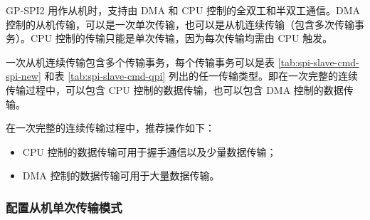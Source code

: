 \documentclass[main\_\_CN.tex]{subfiles}
\begin{document}
GP-SPI2 用作从机时，支持由 DMA 和 CPU 控制的全双工和半双工通信。DMA 控制的从机传输，可以是一次单次传输，也可以是从机连续传输（包含多次传输事务）。CPU 控制的传输只能是单次传输，因为每次传输均需由 CPU 触发。

一次从机连续传输包含多个传输事务，每个传输事务可以是表 \ref{tab:spi-slave-cmd-spi-new} 和表 \ref{tab:spi-slave-cmd-qpi} 列出的任一传输类型。即在一次完整的连续传输过程中，可以包含 CPU 控制的数据传输，也可以包含 DMA 控制的数据传输。

在一次完整的连续传输过程中，推荐操作如下：

\begin{itemize}
    \item CPU 控制的数据传输可用于握手通信以及少量数据传输；

    \item DMA 控制的数据传输可用于大量数据传输。
\end{itemize}


\subsubsection{配置从机单次传输模式}\label{GP-SPI2 slave single transfer}
\end{document}

